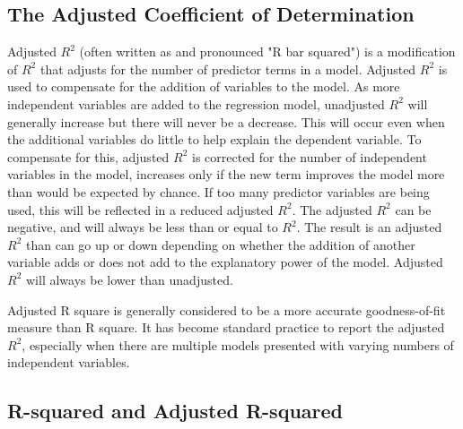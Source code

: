 \documentclass[]{report}
\begin{document}
\subsection{The Adjusted Coefficient of Determination}
Adjusted $R^2$ (often written as and pronounced "R bar squared") is a modification of $R^2$ that adjusts for the number of predictor terms in a model. Adjusted $R^2$ is used to compensate for the addition of variables to the model.  As more independent variables are added to the regression model, unadjusted $R^2$ will generally increase but there will never be a decrease.  This will occur even when the additional variables do little to help explain the dependent variable.  To compensate for this, adjusted $R^2$  is corrected for the number of independent variables in the model, increases only if the new term improves the model more than would be expected by chance. If too many predictor variables are being used, this will be reflected in a reduced adjusted $R^2$. The adjusted $R^2$ can be negative, and will always be less than or equal to $R^2$. The result is an adjusted $R^2$ than can go up or down depending on whether the addition of another variable adds or does not add to the explanatory power of the model. Adjusted $R^2$ will always be lower than unadjusted.


Adjusted R square is generally considered to be a more accurate goodness-of-fit measure than R square. It has become standard practice to report the adjusted $R^2$, especially when there are multiple models presented with varying numbers of independent variables.

%
%
%
%
%
%
%

\subsection*{R-squared and Adjusted R-squared}
\end{document}
